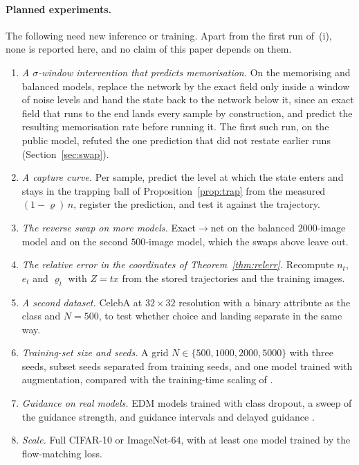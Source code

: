 \documentclass{article} %
\theoremstyle{plain}
\theoremstyle{definition}
\theoremstyle{remark}
\begin{document}
\paragraph{Planned experiments.} The following need new inference or training. Apart from the first
run of~(i), none is reported here, and no claim of this paper depends on them.
\begin{enumerate}[label=(\roman*),leftmargin=2em,itemsep=1pt]
\item \emph{A $\sigma$-window intervention that predicts memorisation.} On the memorising and
  balanced models, replace the network by the exact field only inside a window of noise levels and
  hand the state back to the network below it, since an exact field that runs to the end lands
  every sample by construction, and predict the resulting memorisation rate before running it. The
  first such run, on the public model, refuted the one prediction that did not restate earlier
  runs (Section~\ref{sec:swap}).
\item \emph{A capture curve.} Per sample, predict the level at which the state enters and stays in
  the trapping ball of Proposition~\ref{prop:trap} from the measured $(1-\varrho)\,n$, register the
  prediction, and test it against the trajectory.
\item \emph{The reverse swap on more models.} Exact$\to$net on the balanced $2000$-image model and on
  the second $500$-image model, which the swaps above leave out.
\item \emph{The relative error in the coordinates of Theorem~\ref{thm:relerr}.} Recompute $n_t$,
  $e_t$ and $\varrho_t$ with $Z=tx$ from the stored trajectories and the training images.
\item \emph{A second dataset.} CelebA at $32\times32$ resolution with a binary attribute as the
  class and $N=500$, to test whether choice and landing separate in the same way.
\item \emph{Training-set size and seeds.} A grid $N\in\{500,1000,2000,5000\}$ with three seeds,
  subset seeds separated from training seeds, and one model trained with augmentation, compared
  with the training-time scaling of \citet{bonnaire2025why}.
\item \emph{Guidance on real models.} EDM models trained with class dropout, a sweep of the
  guidance strength, and guidance intervals and delayed guidance
  \citep{kynkaanniemi2024interval,jain2025attraction}.
\item \emph{Scale.} Full CIFAR-10 or ImageNet-$64$, with at least one model trained by the
  flow-matching loss.
\end{enumerate}
\end{document}
